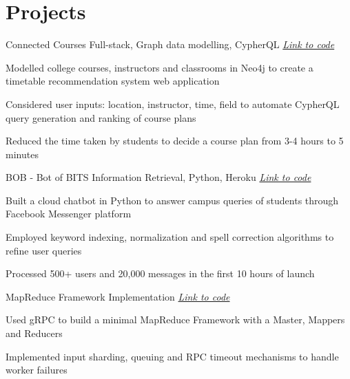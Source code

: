 \section{Projects}
\resumeSubHeadingListStart

\resumeProject
{Connected Courses}
{Full-stack, Graph data modelling, CypherQL}
{\href{https://github.com/sankalp-sangle/connected-courses}{\emph{Link to code}}} 
\resumeItemListStart
    \item[$\bullet$]{Modelled college courses, instructors and classrooms in Neo4j to create a timetable recommendation system web application}
	\item[$\bullet$]{Considered user inputs: location, instructor, time, field to automate CypherQL query generation and ranking of course plans}
	\item[$\bullet$]{Reduced the time taken by students to decide a course plan from 3-4 hours to 5 minutes}
\resumeItemListEnd


\resumeProject
{BOB - Bot of BITS}
{Information Retrieval, Python, Heroku}
{\href{https://github.com/rahul-bothra/bob-the-bot}{\emph{Link to code}}} %
\resumeItemListStart
\item[$\bullet$]{Built a cloud chatbot in Python to answer campus queries of students through Facebook Messenger platform}
	\item[$\bullet$]{Employed keyword indexing, normalization and spell correction algorithms to refine user queries}
	\item[$\bullet$]{Processed 500+ users and 20,000 messages in the first 10 hours of launch}
\resumeItemListEnd

\resumeProject
{MapReduce Framework Implementation}
{}
{\href{https://github.com/sankalp-sangle/AOSP4}{\emph{Link to code}}} %
\resumeItemListStart
\item[$\bullet$]{Used gRPC to build a minimal MapReduce Framework with a Master, Mappers and Reducers}
	\item[$\bullet$]{Implemented input sharding, queuing and RPC timeout mechanisms to handle worker failures}
\resumeItemListEnd

\resumeSubHeadingListEnd

\vspace{-5.5mm}

